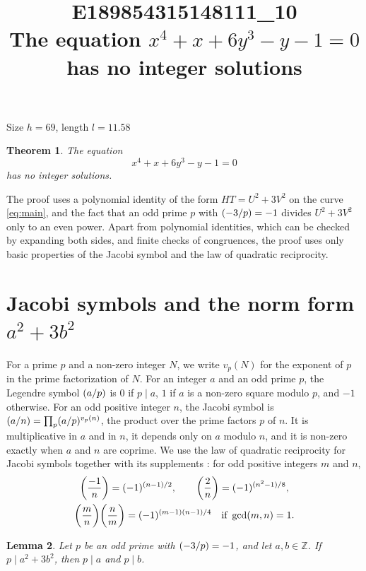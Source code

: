 \documentclass[11pt]{article}
\title{\textbf{E189854315148111\_10}\\[4pt] {\Large The equation $x^{4}+x+6y^{3}-y-1=0$ has no integer solutions}}
\author{}
\date{}
\newtheorem{theorem}{Theorem}
\newtheorem{lemma}[theorem]{Lemma}
\newcommand{\Z}{\mathbb{Z}}
\newcommand{\leg}[2]{\mathchoice{\biggl(\dfrac{#1}{#2}\biggr)}{(#1/#2)}{(#1/#2)}{(#1/#2)}}
\begin{document}
\maketitle
\vspace{-8ex}
\begin{center}
Size $h=69$, length $l=11.58$
\end{center}

\begin{theorem}\label{thm:main}
The equation
\begin{equation}\label{eq:main}
x^{4}+x+6y^{3}-y-1=0
\end{equation}
has no integer solutions.
\end{theorem}

The proof uses a polynomial identity of the form $HT=U^2+3V^2$ on the curve \eqref{eq:main}, and the fact that an odd prime $p$ with $\leg{-3}{p}=-1$ divides $U^2+3V^2$ only to an even power. Apart from polynomial identities, which can be checked by expanding both sides, and finite checks of congruences, the proof uses only basic properties of the Jacobi symbol and the law of quadratic reciprocity.

\section{\texorpdfstring{Jacobi symbols and the norm form $a^2+3b^2$}{Jacobi symbols and the norm form}}

For a prime $p$ and a non-zero integer $N$, we write $v_p(N)$ for the exponent of $p$ in the prime factorization of $N$. For an integer $a$ and an odd prime $p$, the Legendre symbol $\leg{a}{p}$ is $0$ if $p\mid a$, $1$ if $a$ is a non-zero square modulo $p$, and $-1$ otherwise. For an odd positive integer $n$, the Jacobi symbol is $\leg{a}{n}=\prod_p\leg{a}{p}^{v_p(n)}$, the product over the prime factors $p$ of $n$. It is multiplicative in $a$ and in $n$, it depends only on $a$ modulo $n$, and it is non-zero exactly when $a$ and $n$ are coprime. We use the law of quadratic reciprocity for Jacobi symbols together with its supplements \cite[Chapter~5, \S2]{IR}: for odd positive integers $m$ and $n$,
\begin{gather*}
\leg{-1}{n}=(-1)^{(n-1)/2},\qquad\leg{2}{n}=(-1)^{(n^2-1)/8},\\
\leg{m}{n}\leg{n}{m}=(-1)^{(m-1)(n-1)/4}\quad\text{if }\gcd(m,n)=1.
\end{gather*}

\begin{lemma}\label{lem:divides}
Let $p$ be an odd prime with $\leg{-3}{p}=-1$, and let $a,b\in\Z$. If $p\mid a^2+3b^2$, then $p\mid a$ and $p\mid b$.
\end{lemma}
\end{document}
